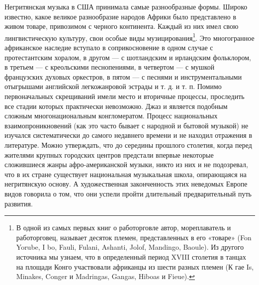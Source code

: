 Негритянская  музыка  в  США   принимала  самые  разнообразные  формы.
Широко  известно,  какое  великое  разнообразие  народов  Африки  было
представлено  в   живом  товаре,  привозимом  с   черного  континента.
Каждый из  них имел  свою лингвистическую  культуру, свои  особые виды
музицирования\footnote{В  одной из  самых первых  книг о  работорговле
автор,   мореплаватель  и   работорговец,  называет   десяток  племен,
представленных  в  его «товаре»  (Fon  Yorube,  I bo,  Fauli,  Fulani,
Ashanti, Jolof, Mandingo, Baoule). Из другого источника мы узнаем, что
в  определенный  период  XVIII  столетия в  танцах  на  площади  Конго
участвовали  африканцы из  шести  разных племен  (К  гае Is,  Minakes,
Conger  и  Madringas,  Gangas,  Hiboas и  Fieue).}.  Это  многогранное
африканское  наследие  вступало в  соприкосновение  в  одном случае  с
протестантским  хоралом,  в  другом   —  с  шотландским  и  ирландским
фольклором,  в третьем  — с  креольскими песнопениями,  в четвертом  —
с  мушкой  французских  духовых  оркестров,  в пятом  —  с  песнями  и
инструментальными отыгрышами английской легкожанровой  эстрады и т. д.
и  т. п.  Помимо первоначальных  скрещиваний имели  место и  вторичные
процессы, проследить все стадии которых практически невозможно. Джаз и
является  подобным  сложным многонациональным  конгломератом.  Процесс
национальных взаимопроникновений  (как это  часто бывает с  народной и
бытовой  музыкой)  не  изучался  систематически  до  самого  недавнего
времени  и  не  находил  отражения  в  литературе.  Можно  утверждать,
что  до  середины  прошлого  столетия, когда  перед  жителями  крупных
городских  центров  предстали   впервые  некоторые  сложившиеся  жанры
афро-американской  музыки, никто  из них  и  не подозревал,  что в  их
стране  существует  национальная  музыкальная  школа,  опирающаяся  на
негритянскую  основу. А  художественная  законченность этих  неведомых
Европе  видов  говорила  о  том,  что  они  успели  пройти  длительный
предварительный путь развития.

